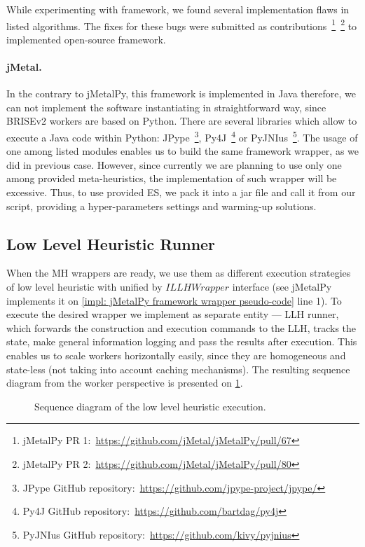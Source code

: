 While experimenting with framework, we found several implementation flaws in listed algorithms. The fixes for these bugs were submitted as contributions~\footnote{jMetalPy PR 1:~\url{https://github.com/jMetal/jMetalPy/pull/67}}~\footnote{jMetalPy PR 2:~\url{https://github.com/jMetal/jMetalPy/pull/80}} to implemented open-source framework.

\paragraph{jMetal.} In the contrary to jMetalPy, this framework is implemented in Java therefore, we can not implement the software instantiating in straightforward way, since BRISEv2 workers are based on Python. There are several libraries which allow to execute a Java code within Python: JPype~\footnote{JPype GitHub repository:~\url{https://github.com/jpype-project/jpype/}}, Py4J~\footnote{Py4J GitHub repository:~\url{https://github.com/bartdag/py4j}} or PyJNIus~\footnote{PyJNIus GitHub repository:~\url{https://github.com/kivy/pyjnius}}. The usage of one among listed modules enables us to build the same framework wrapper, as we did in previous case. However, since currently we are planning to use only one among provided meta-heuristics, the implementation of such wrapper will be excessive. Thus, to use provided ES, we pack it into a jar file and call it from our script, providing a hyper-parameters settings and warming-up solutions.

\subsection{Low Level Heuristic Runner}
When the MH wrappers are ready, we use them as different execution strategies of low level heuristic with unified by $ILLHWrapper$ interface (see jMetalPy implements it on \cref{impl: jMetalPy framework wrapper pseudo-code} line 1). To execute the desired wrapper we implement as separate entity — LLH runner, which forwards the construction and execution commands to the LLH, tracks the state, make general information logging and pass the results after execution. This enables us to scale workers horizontally easily, since they are homogeneous and state-less (not taking into account caching mechanisms). The resulting sequence diagram from the worker perspective is presented on \cref{impl:pict:llh sequence diagram}.

\begin{figure}
	\centering
	
	\caption{Sequence diagram of the low level heuristic execution.}
	\label{impl:pict:llh sequence diagram}
\end{figure}

